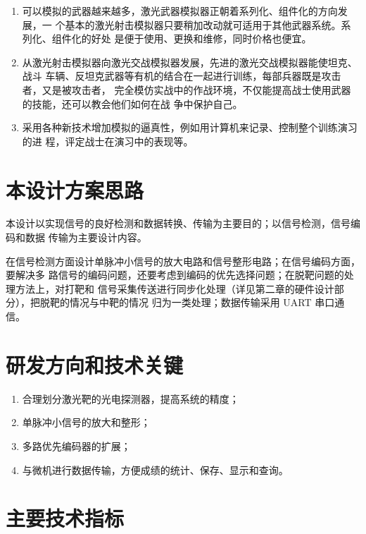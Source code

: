 \begin{enumerate}
  \item 可以模拟的武器越来越多，激光武器模拟器正朝着系列化、组件化的方向发展，一
  个基本的激光射击模拟器只要稍加改动就可适用于其他武器系统。系列化、组件化的好处
  是便于使用、更换和维修，同时价格也便宜。
  \item 从激光射击模拟器向激光交战模拟器发展，先进的激光交战模拟器能使坦克、战斗
  车辆、反坦克武器等有机的结合在一起进行训练，每部兵器既是攻击者，又是被攻击者，
  完全模仿实战中的作战环境，不仅能提高战士使用武器的技能，还可以教会他们如何在战
  争中保护自己。
  \item 采用各种新技术增加模拟的逼真性，例如用计算机来记录、控制整个训练演习的进
  程，评定战士在演习中的表现等。
\end{enumerate}

\section{本设计方案思路}

本设计以实现信号的良好检测和数据转换、传输为主要目的；以信号检测，信号编码和数据
传输为主要设计内容。

在信号检测方面设计单脉冲小信号的放大电路和信号整形电路；在信号编码方面，要解决多
路信号的编码问题，还要考虑到编码的优先选择问题；在脱靶问题的处理方法上，对打靶和
信号采集传送进行同步化处理（详见第二章的硬件设计部分），把脱靶的情况与中靶的情况
归为一类处理；数据传输采用 UART 串口通信。

\section{研发方向和技术关键}

\begin{enumerate}
  \item 合理划分激光靶的光电探测器，提高系统的精度；
  \item 单脉冲小信号的放大和整形；
  \item 多路优先编码器的扩展；
  \item 与微机进行数据传输，方便成绩的统计、保存、显示和查询。
\end{enumerate}

\section{主要技术指标}

